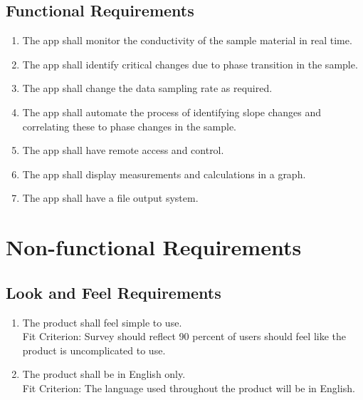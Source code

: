 \documentclass[12pt, titlepage]{article}
\begin{document}
\subsection{Functional Requirements}
\begin{enumerate}[{FR}1.] 
    \item
    The app shall monitor the conductivity of the sample material in real time. 
    \item
    The app shall identify critical changes due to phase transition in the sample.
    \item
    The app shall change the data sampling rate as required.
    \item
    The app shall automate the process of identifying slope changes and correlating these to phase changes in the sample. 
    \item
    The app shall have remote access and control.
    \item
    The app shall display measurements and calculations in a graph.
    \item
    The app shall have a file output system. \\
	
\end{enumerate}

\section{Non-functional Requirements}


\subsection{Look and Feel Requirements}
\begin{adjustwidth}{2.2em}{0pt}
\begin{enumerate}[{NFR-L}1.]
   \item The product shall feel simple to use.\\
   Fit Criterion: Survey should reflect 90 percent of users should feel like the product is uncomplicated to use.
   \item The product shall be in English only.\\
   Fit Criterion: The language used throughout the product will be in English.
\end{enumerate}
\end{adjustwidth}
 
\end{document}
